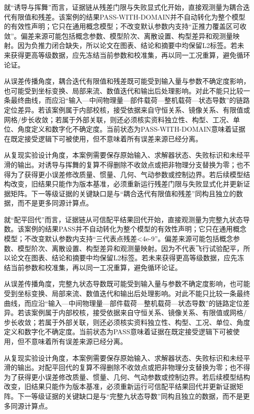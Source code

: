 \documentclass[UTF8,12pt,openany]{ctexbook}
\begin{document}
就“诱导与挥舞”而言，证据链从残差门限与失败显式化开始，直接观测量为耦合迭代有限值和残差。该案例的结果PASS-WITH-DOMAIN并不自动转化为整个模型的有效性声明；它只在通用概念模型；不改变默认参数内支持“正推力覆盖区可收敛”。偏差来源可能包括概念参数、模型阶次、离散设置、构型差异和观测量映射。因为负推力闭合缺失，所以论文在图表、结论和摘要中均保留L2标签。若未来获得更高等级数据，应先冻结当前参数和校准集，再以同一工况重算，避免循环论证。

从误差传播角度，耦合迭代有限值和残差既可能受到输入量与参数不确定度影响，也可能受到坐标变换、局部来流、数值迭代和输出后处理影响。对此不能只比较一条最终曲线，而应沿“输入—中间物理量—部件载荷—整机载荷—状态导数”的链路定位差异。若该案例属于内部校核，接受依据来自守恒关系、镜像关系、有限值或网格/步长收敛；若属于外部关联，则还必须核实资料独立性、构型、工况、单位、角度定义和数字化不确定度。当前状态为PASS-WITH-DOMAIN意味着证据在既定接受逻辑下可被使用，但不意味着所有误差来源已经分离。

从复现实验设计角度，本案例需要保存原始输入、求解器状态、失败标识和未经平滑的输出。对诱导与挥舞的复算不得删除不收敛点或把非物理分支替换为零；也不得为了获得更小误差修改质量、惯量、几何、气动参数或控制边界。若后续模型结构改变，旧结果只能作为版本基准，必须重新运行残差门限与失败显式化并更新证据矩阵。下一等级证据的关键缺口是与“耦合迭代有限值和残差”同构且独立的数据，而不是更多同源计算点。

就“配平回代”而言，证据链从可信配平结果回代开始，直接观测量为完整九状态导数。该案例的结果PASS并不自动转化为整个模型的有效性声明；它只在通用概念模型；不改变默认参数内支持“三代表点残差<4e-9”。偏差来源可能包括概念参数、模型阶次、离散设置、构型差异和观测量映射。因为不代表飞行试验配平，所以论文在图表、结论和摘要中均保留L2标签。若未来获得更高等级数据，应先冻结当前参数和校准集，再以同一工况重算，避免循环论证。

从误差传播角度，完整九状态导数既可能受到输入量与参数不确定度影响，也可能受到坐标变换、局部来流、数值迭代和输出后处理影响。对此不能只比较一条最终曲线，而应沿“输入—中间物理量—部件载荷—整机载荷—状态导数”的链路定位差异。若该案例属于内部校核，接受依据来自守恒关系、镜像关系、有限值或网格/步长收敛；若属于外部关联，则还必须核实资料独立性、构型、工况、单位、角度定义和数字化不确定度。当前状态为PASS意味着证据在既定接受逻辑下可被使用，但不意味着所有误差来源已经分离。

从复现实验设计角度，本案例需要保存原始输入、求解器状态、失败标识和未经平滑的输出。对配平回代的复算不得删除不收敛点或把非物理分支替换为零；也不得为了获得更小误差修改质量、惯量、几何、气动参数或控制边界。若后续模型结构改变，旧结果只能作为版本基准，必须重新运行可信配平结果回代并更新证据矩阵。下一等级证据的关键缺口是与“完整九状态导数”同构且独立的数据，而不是更多同源计算点。
\end{document}
